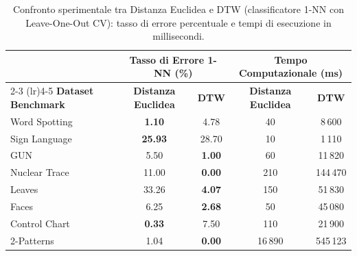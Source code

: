 \begin{table}[H]
\centering
\scriptsize
\setlength{\tabcolsep}{3.5pt}
\renewcommand{\arraystretch}{1.2}
\begin{tabular}{l c c | c c}
\toprule
& \multicolumn{2}{c|}{\textbf{Tasso di Errore 1-NN (\%)}} & \multicolumn{2}{c}{\textbf{Tempo Computazionale (ms)}} \\
\cmidrule(lr){2-3} \cmidrule(lr){4-5}
\textbf{Dataset Benchmark} & \textbf{Distanza Euclidea} & \textbf{DTW} & \textbf{Distanza Euclidea} & \textbf{DTW} \\
\midrule
Word Spotting  & \textbf{1.10}  & 4.78           & 40     & 8\,600   \\
Sign Language  & \textbf{25.93} & 28.70          & 10     & 1\,110   \\
GUN            & 5.50           & \textbf{1.00}  & 60     & 11\,820  \\
Nuclear Trace  & 11.00          & \textbf{0.00}  & 210    & 144\,470 \\
Leaves         & 33.26          & \textbf{4.07}  & 150    & 51\,830  \\
Faces          & 6.25           & \textbf{2.68}  & 50     & 45\,080  \\
Control Chart  & \textbf{0.33}  & 7.50           & 110    & 21\,900  \\
2-Patterns     & 1.04           & \textbf{0.00}  & 16\,890& 545\,123 \\
\bottomrule
\end{tabular}
\caption{Confronto sperimentale tra Distanza Euclidea e DTW (classificatore 1-NN con Leave-One-Out CV): tasso di errore percentuale e tempi di esecuzione in millisecondi.}
\label{tab:ts-benchmark-results}
\end{table}

